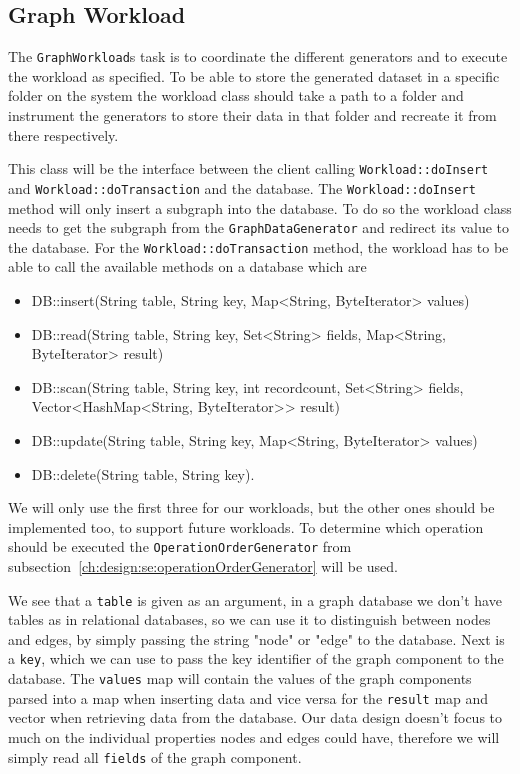 \subsection{Graph Workload}
The \texttt{GraphWorkload}s task is to coordinate the different generators and to execute the workload as specified.
To be able to store the generated dataset in a specific folder on the system the workload class should take a path to a folder and instrument the generators to store their data in that folder and recreate it from there respectively.

This class will be the interface between the client calling \texttt{Workload::doInsert} and \texttt{Workload::doTransaction} and the database.
The \texttt{Workload::doInsert} method will only insert a subgraph into the database.
To do so the workload class needs to get the subgraph from the \texttt{GraphDataGenerator} and redirect its value to the database.
For the \texttt{Workload::doTransaction} method,
the workload has to be able to call the available methods on a database which are

\pagebreak

\begin{itemize}
  \item DB::insert(String table, String key, Map<String, ByteIterator> values)
  \item DB::read(String table, String key, Set<String> fields, Map<String, ByteIterator> result)
  \item DB::scan(String table, String key, int recordcount, Set<String> fields, Vector<HashMap<String, ByteIterator>{}> result)
  \item DB::update(String table, String key, Map<String, ByteIterator> values)
  \item DB::delete(String table, String key).
\end{itemize}

We will only use the first three for our workloads,
but the other ones should be implemented too,
to support future workloads.
To determine which operation should be executed the \texttt{OperationOrderGenerator} from subsection~\ref{ch:design:se:operationOrderGenerator} will be used.

We see that a \texttt{table} is given as an argument,
in a graph database we don't have tables as in relational databases,
so we can use it to distinguish between nodes and edges,
by simply passing the string "node" or "edge" to the database.
Next is a \texttt{key},
which we can use to pass the key identifier of the graph component to the database.
The \texttt{values} map will contain the values of the graph components parsed into a map when inserting data and vice versa for the \texttt{result} map and vector when retrieving data from the database.
Our data design doesn't focus to much on the individual properties nodes and edges could have,
therefore we will simply read all \texttt{fields} of the graph component.

